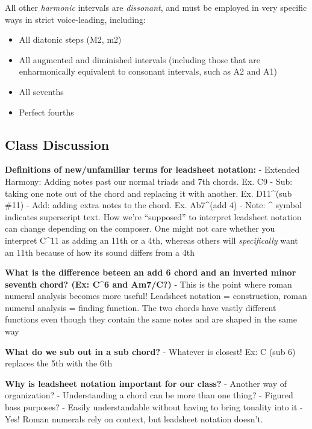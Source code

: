 \documentclass{book}
\providecommand{\tightlist}{%
  \setlength{\itemsep}{0pt}\setlength{\parskip}{0pt}}
\begin{document}
All other \emph{harmonic} intervals are \emph{dissonant}, and must be employed
in very specific ways in strict voice-leading, including:

\begin{itemize}
\tightlist
\item
  All diatonic steps (M2, m2)\\
\item
  All augmented and diminished intervals (including those that are
  enharmonically equivalent to consonant intervals, such as A2 and A1)\\
\item
  All sevenths
\item
  Perfect fourths
\end{itemize}

\hypertarget{class-discussion-50}{%
\subsection{Class Discussion}\label{class-discussion-50}}

\textbf{Definitions of new/unfamiliar terms for leadsheet notation:} -
Extended Harmony: Adding notes past our normal triads and 7th chords. Ex. C9 -
Sub: taking one note out of the chord and replacing it with another. Ex.
D11\^{}(sub \#11) - Add: adding extra notes to the chord. Ex. Ab7\^{}(add 4) -
Note: \^{} symbol indicates superscript text. How we're ``supposed'' to
interpret leadsheet notation can change depending on the composer. One might
not care whether you interpret C\^{}11 as adding an 11th or a 4th, whereas
others will \emph{specifically} want an 11th because of how its sound differs
from a 4th

\textbf{What is the difference beteen an add 6 chord and an inverted minor
seventh chord? (Ex: C\^{}6 and Am7/C?)} - This is the point where roman
numeral analysis becomes more useful! Leadsheet notation = construction, roman
numeral analysis = finding function. The two chords have vastly different
functions even though they contain the same notes and are shaped in the same
way

\textbf{What do we sub out in a sub chord?} - Whatever is closest! Ex: C (sub
6) replaces the 5th with the 6th

\textbf{Why is leadsheet notation important for our class?} - Another way of
organization? - Understanding a chord can be more than one thing? - Figured
bass purposes? - Easily understandable without having to bring tonality into
it - Yes! Roman numerals rely on context, but leadsheet notation doesn't.
\end{document}
